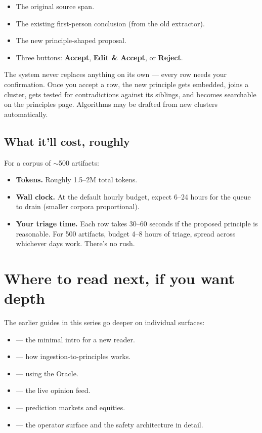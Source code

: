 \documentclass[11pt]{article}
\begin{document}
\begin{itemize}[leftmargin=*]
  \item The original source span.
  \item The existing first-person conclusion (from the old extractor).
  \item The new principle-shaped proposal.
  \item Three buttons: \textbf{Accept}, \textbf{Edit \& Accept}, or
        \textbf{Reject}.
\end{itemize}

The system never replaces anything on its own — every row needs
your confirmation. Once you accept a row, the new principle gets
embedded, joins a cluster, gets tested for contradictions against
its siblings, and becomes searchable on the principles page.
Algorithms may be drafted from new clusters automatically.

\subsection{What it'll cost, roughly}

For a corpus of $\sim$500 artifacts:

\begin{itemize}[leftmargin=*]
  \item \textbf{Tokens.} Roughly 1.5--2M total tokens.
  \item \textbf{Wall clock.} At the default hourly budget, expect
        6--24 hours for the queue to drain (smaller corpora
        proportional).
  \item \textbf{Your triage time.} Each row takes 30--60 seconds
        if the proposed principle is reasonable. For 500 artifacts,
        budget 4--8 hours of triage, spread across whichever days
        work. There's no rush.
\end{itemize}

\section{Where to read next, if you want depth}

The earlier guides in this series go deeper on individual surfaces:

\begin{itemize}[leftmargin=*]
  \item {} — the minimal
        intro for a new reader.
  \item {} — how
        ingestion-to-principles works.
  \item {} — using the Oracle.
  \item {} — the live opinion feed.
  \item {} —
        prediction markets and equities.
  \item {} — the operator
        surface and the safety architecture in detail.
\end{itemize}
\end{document}
